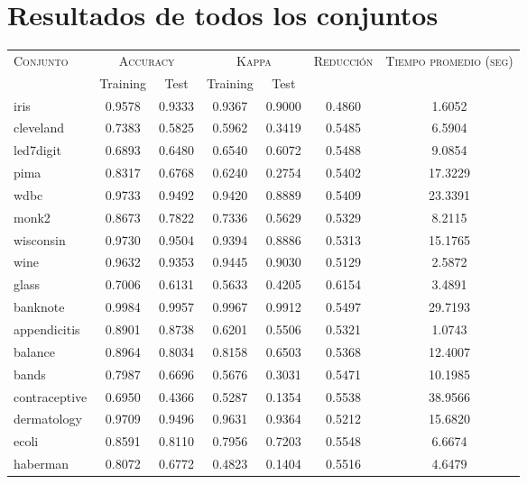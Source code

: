 \chapter{Resultados de todos los conjuntos}
\label{Apéndices}


\begin{table}[]
\centering
\begin{tabular}{l c c c c c c}
\hline
\multirow{2}{*}{\textsc{Conjunto}}
	& \multicolumn{2}{c}{\textsc{Accuracy}}
	& \multicolumn{2}{c}{\textsc{Kappa}}
	& \textsc{Reducción}
	& \textsc{Tiempo promedio (seg)} \\
	& Training & Test
	& Training & Test \\ 
\hline
\hline

iris & 0.9578 & 0.9333 & 0.9367 & 0.9000 & 0.4860 & 1.6052 \\
cleveland & 0.7383 & 0.5825 & 0.5962 & 0.3419 & 0.5485 & 6.5904 \\
led7digit & 0.6893 & 0.6480 & 0.6540 & 0.6072 & 0.5488 & 9.0854 \\
pima & 0.8317 & 0.6768 & 0.6240 & 0.2754 & 0.5402 & 17.3229 \\
wdbc & 0.9733 & 0.9492 & 0.9420 & 0.8889 & 0.5409 & 23.3391 \\
monk2 & 0.8673 & 0.7822 & 0.7336 & 0.5629 & 0.5329 & 8.2115 \\
wisconsin & 0.9730 & 0.9504 & 0.9394 & 0.8886 & 0.5313 & 15.1765 \\
wine & 0.9632 & 0.9353 & 0.9445 & 0.9030 & 0.5129 & 2.5872 \\
glass & 0.7006 & 0.6131 & 0.5633 & 0.4205 & 0.6154 & 3.4891 \\
banknote & 0.9984 & 0.9957 & 0.9967 & 0.9912 & 0.5497 & 29.7193 \\
appendicitis & 0.8901 & 0.8738 & 0.6201 & 0.5506 & 0.5321 & 1.0743 \\
balance & 0.8964 & 0.8034 & 0.8158 & 0.6503 & 0.5368 & 12.4007 \\
bands & 0.7987 & 0.6696 & 0.5676 & 0.3031 & 0.5471 & 10.1985 \\ 
contraceptive & 0.6950 & 0.4366 & 0.5287 & 0.1354 & 0.5538 & 38.9566 \\
dermatology & 0.9709 & 0.9496 & 0.9631 & 0.9364 & 0.5212 & 15.6820 \\
ecoli & 0.8591 & 0.8110 & 0.7956 & 0.7203 & 0.5548 & 6.6674 \\
haberman & 0.8072 & 0.6772 & 0.4823 & 0.1404 & 0.5516 & 4.6479 \\

\end{tabular}
\end{table}
